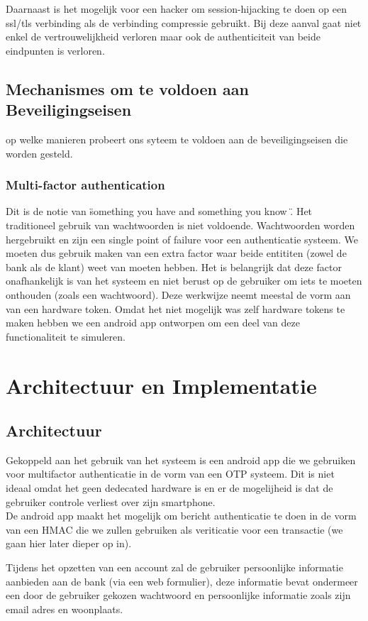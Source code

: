 \documentclass[11pt]{article}
\begin{document}
Daarnaast is het mogelijk voor een hacker om session-hijacking te doen op een ssl/tls verbinding als de verbinding compressie gebruikt. Bij deze aanval gaat niet enkel de vertrouwelijkheid verloren maar ook de authenticiteit van beide eindpunten is verloren.

\subsection{Mechanismes om te voldoen aan Beveiligingseisen}
op welke manieren probeert ons syteem te voldoen aan de beveiligingseisen die worden gesteld.

\subsubsection{Multi-factor authentication}
Dit is de notie van \"something you have and something you know \". 
Het traditioneel gebruik van wachtwoorden is niet voldoende. Wachtwoorden worden hergebruikt en zijn een single point of failure voor een authenticatie systeem. We moeten dus gebruik maken van een extra factor waar beide entititen (zowel de bank als de klant) weet van moeten hebben. Het is belangrijk dat deze factor onafhankelijk is van het systeem en niet berust op de gebruiker om iets te moeten onthouden (zoals een wachtwoord). Deze werkwijze neemt meestal de vorm aan van een hardware token. Omdat het niet mogelijk was zelf hardware tokens te maken hebben we een android app ontworpen om een deel van deze functionaliteit te simuleren.
\section{Architectuur en Implementatie}
\subsection{Architectuur}
Gekoppeld aan het gebruik van het systeem is een android app die we gebruiken voor multifactor authenticatie in de vorm van een OTP systeem. Dit is niet ideaal omdat het geen dedecated hardware is en er de mogelijheid is dat de gebruiker controle verliest over zijn smartphone.\\

De android app maakt het mogelijk om bericht authenticatie te doen in de vorm van een HMAC die we zullen gebruiken als veriticatie voor een transactie (we gaan hier later dieper op in).

Tijdens het opzetten van een account zal de gebruiker persoonlijke informatie aanbieden aan de bank (via een web formulier), deze informatie bevat ondermeer een door de gebruiker gekozen wachtwoord en persoonlijke informatie zoals zijn email adres en woonplaats.\\
\end{document}

